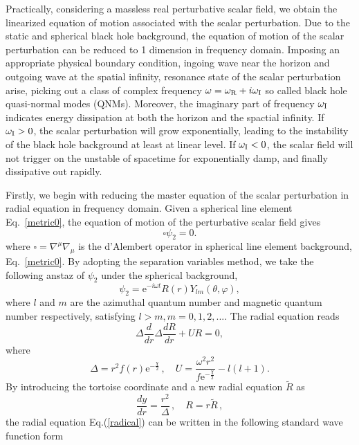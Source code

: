 \documentclass[pr, twocolumn, preprintnumbers, showpacs,footnoteadded, superscriptaddress,nofootinbib,longbibliography]{revtex4-1}
\newcommand{\te}{\mathrm{e}}
\begin{document}
Practically, considering a massless real perturbative scalar field, we obtain the linearized equation of motion associated with the scalar perturbation. Due to the static and spherical black hole background, the equation of motion of the scalar perturbation can be reduced to 1 dimension in frequency domain\cite{Chandrasekhar:1975zza}. Imposing an appropriate physical boundary condition, ingoing wave near the horizon and outgoing wave at the spatial infinity, resonance state of the scalar perturbation arise, picking out a class of complex frequency $\omega = \omega_{\rm R}+ i \omega_{\rm I}$ so called black hole quasi-normal modes (QNMs).  Moreover, the imaginary part of frequency $\omega_{\rm I}$ indicates energy dissipation at both the horizon and the spactial infinity. If $\omega_{\rm I}>0$, the scalar perturbation will grow exponentially, leading to the instability of the black hole background at least at linear level. If $\omega_{\rm I}<0$, the scalar field will not trigger on the unstable of spacetime for exponentially damp, and finally dissipative out rapidly.

Firstly, we begin with reducing the master equation of the scalar perturbation in radial equation in frequency domain. Given a spherical line element Eq.~\eqref{metric0}, the equation of motion of the perturbative scalar field gives
%
\begin{equation}\label{proeom}
\square \psi_2 =0.
\end{equation}
%
where $\square=\nabla^\mu \nabla_\mu$ is the d'Alembert operator in spherical line element background, Eq.~\eqref{metric0}. By adopting the separation variables method, we take the following anstaz of $\psi_2$ under the spherical background,
%
\begin{equation}
\psi_2=\te^{-i \omega t}R(r)Y_{lm}(\theta,\varphi),
\end{equation}
%
where $l$ and $m$ are the azimuthal quantum number and magnetic quantum number respectively, satisfying $l>m, m=0,1,2,...$. The radial equation reads
%
\begin{equation}\label{radical}
\Delta \frac{d}{dr}\Delta \frac{dR}{dr}+ U R =0,
\end{equation}
%
where
%
\begin{equation}
\Delta=r^2 f(r)\te^{-\frac{\chi}{2}}\, , \quad U=\frac{\omega^2 r^2}{f \te^{-\frac{\chi}{2}}}-l(l+1).
\end{equation}
%
By introducing the tortoise coordinate and a new radial equation $\tilde{R}$ as
%
\begin{equation}\label{tortoise}
\frac{dy}{dr}=\frac{r^2}{\Delta}\, , \quad R=r \tilde{R}\, ,
\end{equation}
%
the radial equation Eq.(\ref{radical}) can be written in the following standard wave function form
\end{document}
